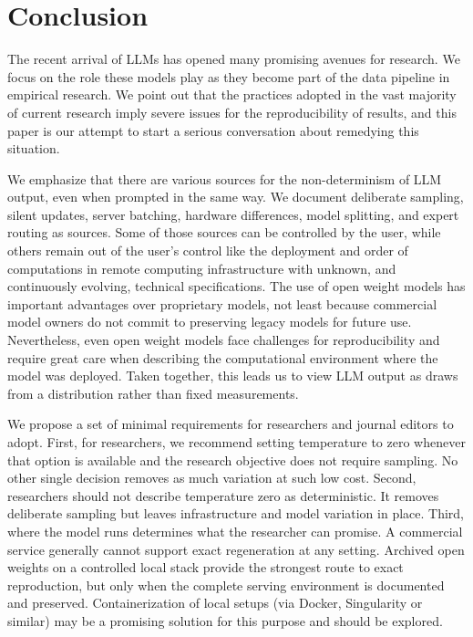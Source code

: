 \documentclass[11pt]{article}
\begin{document}
\section{Conclusion}

The recent arrival of LLMs has opened many promising avenues for research. We focus on the role these models play as they become part of the data pipeline in empirical research. We point out that the practices adopted in the vast majority of current research imply severe issues for the reproducibility of results, and this paper is our attempt to start a serious conversation about remedying this situation.\medskip


We emphasize that there are various sources for the non-determinism of LLM output, even when prompted in the same way. We document deliberate sampling, silent updates, server batching, hardware differences, model splitting, and expert routing as sources. Some of those sources can be controlled by the user, while others remain out of the user's control like the deployment and order of computations in remote computing infrastructure with unknown, and continuously evolving, technical specifications. The use of open weight models has important advantages over proprietary models, not least because commercial model owners do not commit to preserving legacy models for future use. Nevertheless, even open weight models face challenges for reproducibility and require great care when describing the computational environment where the model was deployed. Taken together, this leads us to view LLM output as draws from a distribution rather than fixed measurements. \medskip


We propose a set of minimal requirements for researchers and journal editors to adopt. First, for researchers, we recommend setting temperature to zero whenever that option is available and the research objective does not require sampling. No other single decision removes as much variation at such low cost. Second, researchers should not describe temperature zero as deterministic. It removes deliberate sampling but leaves infrastructure and model variation in place. Third, where the model runs determines what the researcher can promise. A commercial service generally cannot support exact regeneration at any setting. Archived open weights on a controlled local stack provide the strongest route to exact reproduction, but only when the complete serving environment is documented and preserved. Containerization of local setups (via Docker, Singularity or similar) may be a promising solution for this purpose and should be explored. \medskip
\end{document}
